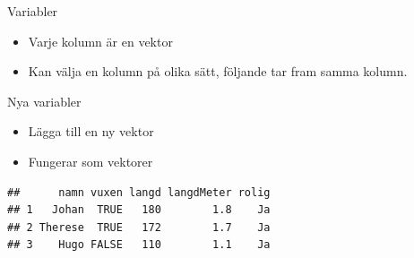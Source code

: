 \documentclass[
  11pt,
  ignorenonframetext,
]{beamer}
\newenvironment{Shaded}{\begin{snugshade}}{\end{snugshade}}
\newcommand{\DecValTok}[1]{\textcolor[rgb]{0.00,0.00,0.81}{#1}}
\newcommand{\FloatTok}[1]{\textcolor[rgb]{0.00,0.00,0.81}{#1}}
\newcommand{\KeywordTok}[1]{\textcolor[rgb]{0.13,0.29,0.53}{\textbf{#1}}}
\newcommand{\NormalTok}[1]{#1}
\newcommand{\OperatorTok}[1]{\textcolor[rgb]{0.81,0.36,0.00}{\textbf{#1}}}
\newcommand{\StringTok}[1]{\textcolor[rgb]{0.31,0.60,0.02}{#1}}
\providecommand{\tightlist}{%
  \setlength{\itemsep}{0pt}\setlength{\parskip}{0pt}}
\begin{document}

\begin{frame}[fragile]{Variabler}
\protect\hypertarget{variabler}{}
\begin{itemize}
\tightlist
\item
  Varje kolumn är en vektor
\item
  Kan välja en kolumn på olika sätt, följande tar fram samma kolumn.
\end{itemize}

\begin{Shaded}
\end{Shaded}
\end{frame}


\begin{frame}[fragile]{Nya variabler}
\protect\hypertarget{nya-variabler}{}
\begin{itemize}
\tightlist
\item
  Lägga till en ny vektor
\item
  Fungerar som vektorer
\end{itemize}

\begin{Shaded}
\end{Shaded}

\begin{verbatim}
##      namn vuxen langd langdMeter rolig
## 1   Johan  TRUE   180        1.8    Ja
## 2 Therese  TRUE   172        1.7    Ja
## 3    Hugo FALSE   110        1.1    Ja
\end{verbatim}
\end{frame}
\end{document}
